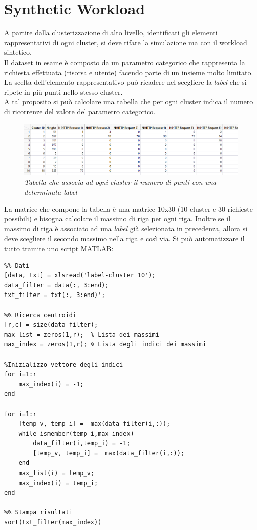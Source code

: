 \section{Synthetic Workload}
A partire dalla clusterizzazione di alto livello, identificati gli elementi rappresentativi di ogni cluster, si deve rifare la simulazione ma con il workload sintetico.
\\Il dataset in esame è composto da un parametro categorico che rappresenta la richiesta effettuata (risorsa e utente) facendo parte di un insieme molto limitato. La scelta dell'elemento rappresentativo può ricadere nel scegliere la \textit{label} che si ripete in più punti nello stesso cluster.
\\A tal proposito si può calcolare una tabella che per ogni cluster indica il numero di ricorrenze del valore del parametro categorico.
\begin{figure}[H]
	\centering
	\includegraphics[width=\textwidth]{img/hw3/cluster_label.png}
	\caption{\textit{Tabella che associa ad ogni cluster il numero di punti con una determinata \textit{label}}}
\end{figure}
La matrice che compone la tabella è una matrice 10x30 (10 cluster e 30 richieste possibili) e bisogna calcolare il massimo di riga per ogni riga. Inoltre se il massimo di riga è associato ad una \textit{label} già selezionata in precedenza, allora si deve scegliere il secondo massimo nella riga e così via. Si può automatizzare il tutto tramite uno script MATLAB:
\begin{verbatim}
%% Dati
[data, txt] = xlsread('label-cluster 10');
data_filter = data(:, 3:end); 
txt_filter = txt(:, 3:end)';

%% Ricerca centroidi
[r,c] = size(data_filter);
max_list = zeros(1,r);  % Lista dei massimi
max_index = zeros(1,r); % Lista degli indici dei massimi

%Inizializzo vettore degli indici
for i=1:r
	max_index(i) = -1;
end

for i=1:r
	[temp_v, temp_i] =  max(data_filter(i,:));
	while ismember(temp_i,max_index)
		data_filter(i,temp_i) = -1;
		[temp_v, temp_i] =  max(data_filter(i,:));
	end
	max_list(i) = temp_v;
	max_index(i) = temp_i;
end

%% Stampa risultati
sort(txt_filter(max_index))
\end{verbatim}
